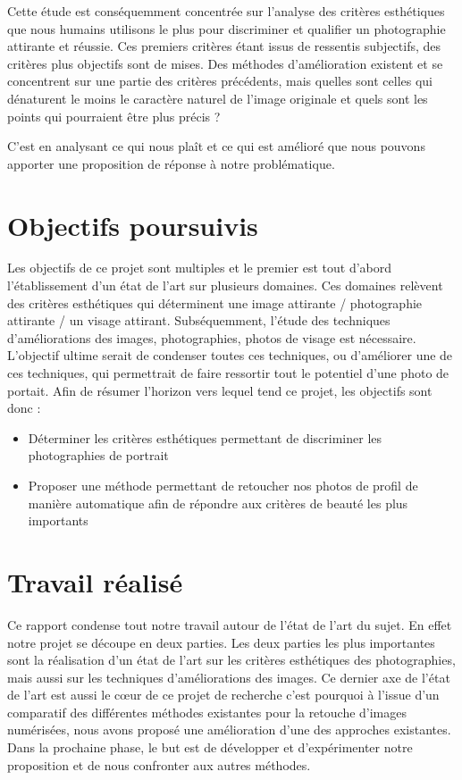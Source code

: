 \documentclass[11pt, french]{report-rd-info}
\begin{document}
Cette étude est conséquemment concentrée sur l'analyse des critères esthétiques que nous humains utilisons le plus pour discriminer et qualifier un photographie attirante et réussie. Ces premiers critères étant issus de ressentis subjectifs, des critères plus objectifs sont de mises.
Des méthodes d'amélioration existent et se concentrent sur une partie des critères précédents, mais quelles sont celles qui dénaturent le moins le caractère naturel de l'image originale et quels sont les points qui pourraient être plus précis ?

C'est en analysant ce qui nous plaît et ce qui est amélioré que nous pouvons apporter une proposition de réponse à notre problématique.
\section{Objectifs poursuivis}
Les objectifs de ce projet sont multiples et le premier est tout d'abord l'établissement d'un état de l'art sur plusieurs domaines. Ces domaines relèvent des critères esthétiques qui déterminent une image attirante / photographie attirante / un visage attirant. Subséquemment, l'étude des techniques d'améliorations des images, photographies, photos de visage est nécessaire. L'objectif ultime serait de condenser toutes ces techniques, ou d'améliorer une de ces techniques, qui permettrait de faire ressortir tout le potentiel d'une photo de portait. Afin de résumer l'horizon vers lequel tend ce projet, les objectifs sont donc :
\begin{itemize}
\item Déterminer les critères esthétiques permettant de discriminer les photographies de portrait
\item Proposer une méthode permettant de retoucher nos photos de profil de manière automatique afin de répondre aux critères de beauté les plus importants
\end{itemize}
\section{Travail réalisé}
Ce rapport condense tout notre travail autour de l'état de l'art du sujet. En effet notre projet se découpe en deux parties. Les deux parties les plus importantes sont la réalisation d'un état de l'art sur les critères esthétiques des photographies, mais aussi sur les techniques d'améliorations des images. Ce dernier axe de l'état de l'art est aussi le cœur de ce projet de recherche c'est pourquoi à l'issue d'un comparatif des différentes méthodes existantes pour la retouche d'images numérisées, nous avons proposé une amélioration d'une des approches existantes.
Dans la prochaine phase, le but est de développer et d'expérimenter notre proposition et de nous confronter aux autres méthodes.
\end{document}
